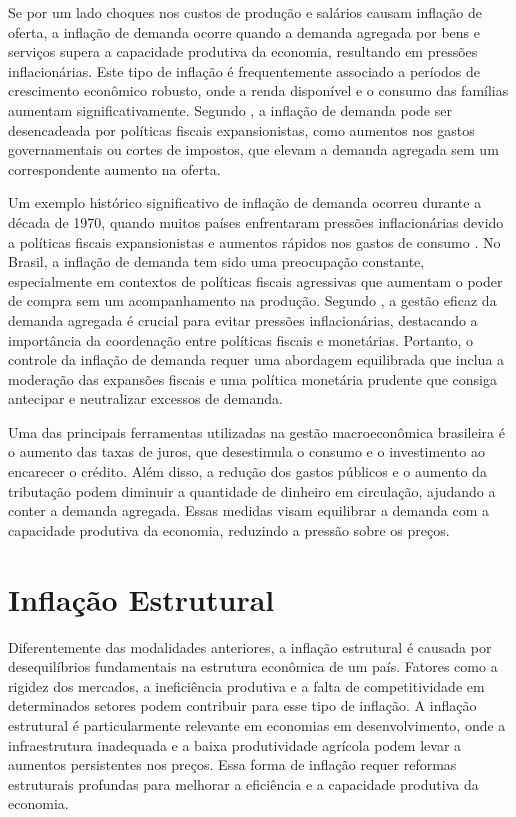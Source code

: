 \documentclass[12pt,oneside,a4paper,chapter=TITLE,english,brazil,sumario=abnt-6027-2012]{abntex2}
\begin{document}
Se por um lado choques nos custos de produção e salários causam inflação de oferta, a inflação de demanda ocorre quando a demanda agregada por bens e serviços supera a capacidade produtiva da economia, resultando em pressões inflacionárias. Este tipo de inflação é frequentemente associado a períodos de crescimento econômico robusto, onde a renda disponível e o consumo das famílias aumentam significativamente. Segundo , a inflação de demanda pode ser desencadeada por políticas fiscais expansionistas, como aumentos nos gastos governamentais ou cortes de impostos, que elevam a demanda agregada sem um correspondente aumento na oferta.

Um exemplo histórico significativo de inflação de demanda ocorreu durante a década de 1970, quando muitos países enfrentaram pressões inflacionárias devido a políticas fiscais expansionistas e aumentos rápidos nos gastos de consumo \cite{blinder_2008_the}. No Brasil, a inflação de demanda tem sido uma preocupação constante, especialmente em contextos de políticas fiscais agressivas que aumentam o poder de compra sem um acompanhamento na produção. Segundo \cite{woodford_2009_interest}, a gestão eficaz da demanda agregada é crucial para evitar pressões inflacionárias, destacando a importância da coordenação entre políticas fiscais e monetárias. Portanto, o controle da inflação de demanda requer uma abordagem equilibrada que inclua a moderação das expansões fiscais e uma política monetária prudente que consiga antecipar e neutralizar excessos de demanda.


Uma das principais ferramentas utilizadas na gestão macroeconômica brasileira é o aumento das taxas de juros, que desestimula o consumo e o investimento ao encarecer o crédito. Além disso, a redução dos gastos públicos e o aumento da tributação podem diminuir a quantidade de dinheiro em circulação, ajudando a conter a demanda agregada. Essas medidas visam equilibrar a demanda com a capacidade produtiva da economia, reduzindo a pressão sobre os preços.

\section{Inflação Estrutural}

Diferentemente das modalidades anteriores, a inflação estrutural é causada por desequilíbrios fundamentais na estrutura econômica de um país. Fatores como a rigidez dos mercados, a ineficiência produtiva e a falta de competitividade em determinados setores podem contribuir para esse tipo de inflação. A inflação estrutural é particularmente relevante em economias em desenvolvimento, onde a infraestrutura inadequada e a baixa produtividade agrícola podem levar a aumentos persistentes nos preços. Essa forma de inflação requer reformas estruturais profundas para melhorar a eficiência e a capacidade produtiva da economia.
\end{document}
